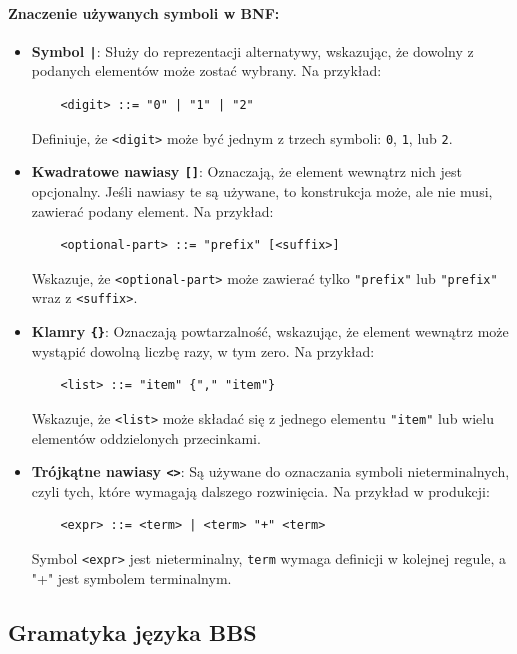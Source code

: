 \paragraph{Znaczenie używanych symboli w BNF:}
\begin{itemize}
    \item \textbf{Symbol \texttt{|}}: Służy do reprezentacji alternatywy, wskazując, że dowolny z podanych elementów może zostać wybrany. Na przykład:
    \begin{verbatim}
    <digit> ::= "0" | "1" | "2"
    \end{verbatim}
    Definiuje, że \texttt{<digit>} może być jednym z trzech symboli: \texttt{0}, \texttt{1}, lub \texttt{2}.
    
    \item \textbf{Kwadratowe nawiasy \texttt{[]}}: Oznaczają, że element wewnątrz nich jest opcjonalny. Jeśli nawiasy te są używane, to konstrukcja może, ale nie musi, zawierać podany element. Na przykład:
    \begin{verbatim}
    <optional-part> ::= "prefix" [<suffix>]
    \end{verbatim}
    Wskazuje, że \texttt{<optional-part>} może zawierać tylko \texttt{"prefix"} lub \texttt{"prefix"} wraz z \texttt{<suffix>}.
    
    \item \textbf{Klamry \texttt{\{\}}}: Oznaczają powtarzalność, wskazując, że element wewnątrz może wystąpić dowolną liczbę razy, w tym zero. Na przykład:
    \begin{verbatim}
    <list> ::= "item" {"," "item"}
    \end{verbatim}
    Wskazuje, że \texttt{<list>} może składać się z jednego elementu \texttt{"item"} lub wielu elementów oddzielonych przecinkami.
    
    \item \textbf{Trójkątne nawiasy \texttt{<>}}: Są używane do oznaczania symboli nieterminalnych, czyli tych, które wymagają dalszego rozwinięcia. Na przykład w produkcji:
    \begin{verbatim}
    <expr> ::= <term> | <term> "+" <term>
    \end{verbatim}
    Symbol \texttt{<expr>} jest nieterminalny, \texttt{term} wymaga definicji w kolejnej regule, a "+" jest symbolem terminalnym.
\end{itemize}

\subsection{Gramatyka języka BBS}

